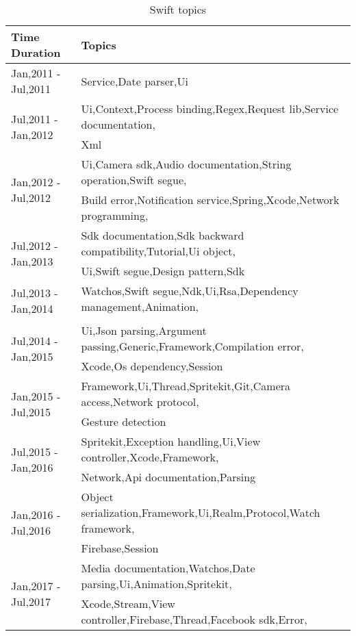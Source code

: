 \begin{table}[]
\begin{tabular}{|l|l|}
\hline
Time Duration & Topics \\ \hline


\multirow{1}{*}{Jan,2011 - Jul,2011} & Service,Date parser,Ui\\ \hline
\multirow{2}{*}{Jul,2011 - Jan,2012} & Ui,Context,Process binding,Regex,Request lib,Service documentation,\\ & Xml\\ \hline
\multirow{2}{*}{Jan,2012 - Jul,2012} & Ui,Camera sdk,Audio documentation,String operation,Swift segue,\\ & Build error,Notification service,Spring,Xcode,Network programming,\\ \hline
\multirow{2}{*}{Jul,2012 - Jan,2013} & Sdk documentation,Sdk backward compatibility,Tutorial,Ui object,\\ & Ui,Swift segue,Design pattern,Sdk\\ \hline
\multirow{2}{*}{Jul,2013 - Jan,2014} & Watchos,Swift segue,Ndk,Ui,Rsa,Dependency management,Animation,\\\\ \hline
\multirow{2}{*}{Jul,2014 - Jan,2015} & Ui,Json parsing,Argument passing,Generic,Framework,Compilation error,\\ & Xcode,Os dependency,Session\\ \hline
\multirow{2}{*}{Jan,2015 - Jul,2015} & Framework,Ui,Thread,Spritekit,Git,Camera access,Network protocol,\\ & Gesture detection\\ \hline
\multirow{2}{*}{Jul,2015 - Jan,2016} & Spritekit,Exception handling,Ui,View controller,Xcode,Framework,\\ & Network,Api documentation,Parsing\\ \hline
\multirow{2}{*}{Jan,2016 - Jul,2016} & Object serialization,Framework,Ui,Realm,Protocol,Watch framework,\\ & Firebase,Session\\ \hline
\multirow{2}{*}{Jan,2017 - Jul,2017} & Media documentation,Watchos,Date parsing,Ui,Animation,Spritekit,\\ & Xcode,Stream,View controller,Firebase,Thread,Facebook sdk,Error,\\ \hline
\end{tabular}
\caption{Swift topics}
\label{table:Swift topics}
\end{table}